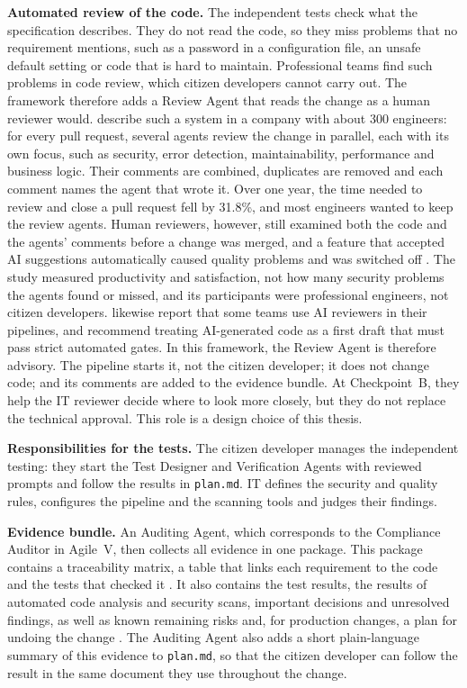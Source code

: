 \documentclass[10pt,a4paper]{article}
\begin{document}
\textbf{Automated review of the code.}
\label{sec:security-review-agent}
The independent tests check what the specification describes. They do not
read the code, so they miss problems that no requirement mentions, such as
a password in a configuration file, an unsafe default setting or code that
is hard to maintain. Professional teams find such problems in code review,
which citizen developers cannot carry out. The framework therefore adds a
Review Agent that reads the change as a human reviewer would.
\textcite{TODO-kumar2025intuition} describe such a system in a company with
about 300 engineers: for every pull request, several agents review the
change in parallel, each with its own focus, such as security, error
detection, maintainability, performance and business logic. Their comments
are combined, duplicates are removed and each comment names the agent that
wrote it. Over one year, the time needed to review and close a pull
request fell by 31.8\%, and most engineers wanted to keep the review
agents. Human reviewers, however, still examined both the code and the
agents' comments before a change was merged, and a feature that accepted
AI suggestions automatically caused quality problems and was switched off
\parencite{TODO-kumar2025intuition}. The study measured productivity and
satisfaction, not how many security problems the agents found or missed,
and its participants were professional engineers, not citizen developers.
\textcite{waseem2025} likewise report that some teams use AI reviewers in
their pipelines, and recommend treating AI-generated code as a first draft
that must pass strict automated gates. In this framework, the Review Agent
is therefore advisory. The pipeline starts it, not the citizen developer;
it does not change code; and its comments are added to the evidence
bundle. At Checkpoint~B, they help the IT reviewer decide where to look
more closely, but they do not replace the technical approval. This role is
a design choice of this thesis.
 

\textbf{Responsibilities for the tests.} The citizen developer manages the
independent testing: they start the Test Designer and Verification Agents
with reviewed prompts and follow the results in \texttt{plan.md}. IT defines
the security and quality rules, configures the pipeline and the scanning
tools and judges their findings.

\textbf{Evidence bundle.} An Auditing Agent, which corresponds to the
Compliance Auditor in Agile~V, then collects all evidence in one package.
This package contains a traceability matrix, a table that links each
requirement to the code and the tests that checked it
\parencite{koch2026agile}. It also contains the test results, the results of
automated code analysis and security scans, important decisions and
unresolved findings, as well as known remaining risks and, for production
changes, a plan for undoing the change \parencite{koch2026agentic}. The
Auditing Agent also adds a short plain-language summary of this evidence to
\texttt{plan.md}, so that the citizen developer can follow the result in the
same document they use throughout the change.
\end{document}
